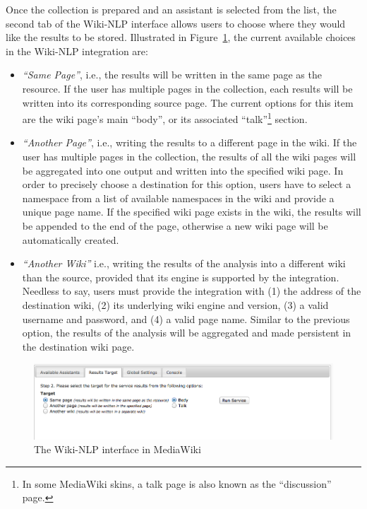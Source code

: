 \blankline
Once the collection is prepared and an assistant is selected from the list, the second tab of the Wiki-NLP interface allows users to choose where they would like the results to be stored. Illustrated in Figure~\ref{fig:semassist_target}, the current available choices in the Wiki-NLP integration are:

\begin{itemize}\itemsep1mm
\item \emph{``Same Page''}, i.e., the results will be written in the same page as the resource. If the user has multiple pages in the collection, each results will be written into its corresponding source page. The current options for this item are the wiki page's main ``body'', or its associated ``talk''\footnote{In some MediaWiki skins, a talk page is also known as the ``discussion'' page.} section.
\item \emph{``Another Page''}, i.e., writing the results to a different page in the wiki. If the user has multiple pages in the collection, the results of all the wiki pages will be aggregated into one output and written into the specified wiki page. In order to precisely choose a destination for this option, users have to select a namespace from a list of available namespaces in the wiki and provide a unique page name. If the specified wiki page exists in the wiki, the results will be appended to the end of the page, otherwise a new wiki page will be automatically created.
\item \emph{``Another Wiki''} i.e., writing the results of the analysis into a different wiki than the source, provided that its engine is supported by the integration. Needless to say, users must provide the integration with (1) the address of the destination wiki, (2) its underlying wiki engine and version, (3) a valid username and password, and (4) a valid page name. Similar to the previous option, the results of the analysis will be aggregated and made persistent in the destination wiki page.
\end{itemize}

\begin{figure}
\centering
\includegraphics[width=\textwidth]{pictures/semassist_target.png}
\caption{The Wiki-NLP interface in MediaWiki}
\label{fig:semassist_target}
\end{figure}

